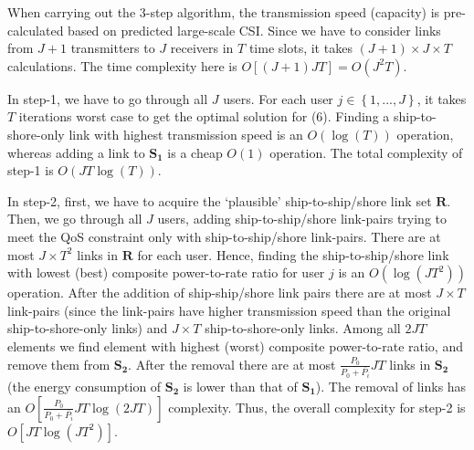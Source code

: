 \documentclass[journal]{IEEEtran}
\begin{document}
 When carrying out the 3-step algorithm, the transmission speed (capacity) is pre-calculated based on predicted large-scale CSI. Since we have to consider links from $J+1$ transmitters to $J$ receivers in $T$ time slots, it takes $\left( {J + 1} \right) \times J \times T$ calculations. The time complexity here is $O\left[ {\left( {J + 1} \right)JT} \right] = O\left( {{J^2}T} \right)$. 

 In step-1, we have to go through all $J$ users. For each user $j \in \left\{ {1,...,J} \right\}$, it takes $T$ iterations worst case to get the optimal solution for (6). Finding a ship-to-shore-only link with highest transmission speed is an $O\left( \log \left( T \right) \right)$ operation, whereas adding a link to ${{\mathbf{S}}_{\mathbf{1}}}$ is a cheap $O\left( 1 \right)$ operation. The total complexity of step-1 is $O\left( J T\log \left( T \right) \right)$.

 In step-2, first, we have to acquire the `plausible' ship-to-ship/shore link set ${\mathbf{R}}$. %
 Then, we go through all $J$ users, adding ship-to-ship/shore link-pairs trying to meet the QoS constraint only with ship-to-ship/shore link-pairs. There are at most $J \times T^2$ links in ${\mathbf{R}}$ for each user. Hence, finding the ship-to-ship/shore link with lowest (best) composite power-to-rate ratio for user $j$ is an $O\left( \log \left( JT^2 \right) \right)$ operation. 
 After the addition of ship-ship/shore link pairs there are at most $J \times T$ link-pairs (since the link-pairs have higher transmission speed than the original ship-to-shore-only links) and 
 $J \times T$ ship-to-shore-only links. 
 Among all ${2J}T$ elements we find element with highest (worst) composite power-to-rate ratio, and remove them from ${{\mathbf{S}}_{\mathbf{2}}}$. After the removal there are at most $\frac{{{P_0}}}{{{P_0} + \overline {{P_i}} }} { J} T$ links in ${{\mathbf{S}}_{\mathbf{2}}}$ (the energy consumption of ${{\mathbf{S}}_{\mathbf{2}}}$ is lower than that of ${{\mathbf{S}}_{\mathbf{1}}}$). 
 The removal of links has an $O\left[ \frac{{{P_0}}}{{{P_0} + \overline {{P_i}} }} { J} T \log \left( { {2J} T} \right)  \right]$ complexity. 
 Thus, the overall complexity for step-2 is $O\left[ {JT \log \left( JT^2 \right)} \right]$. 
\end{document}
